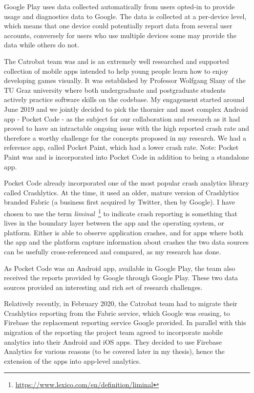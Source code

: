 Google Play uses data collected automatically from users opted-in to provide usage and diagnostics data to Google. The data is collected at a per-device level, which means that one device could potentially report data from several user accounts, conversely for users who use multiple devices some may provide the data while others do not.

The Catrobat team was and is an extremely well researched and supported collection of mobile apps intended to help young people learn how to enjoy developing games visually. It was established by Professor Wolfgang Slany of the TU Graz university where both undergraduate and postgraduate students actively practice software skills on the codebase. My engagement started around June 2019 and we jointly decided to pick the thornier and most complex Android app - Pocket Code - as the subject for our collaboration and research as it had proved to have an intractable ongoing issue with the high reported crash rate and therefore a worthy challenge for the concepts proposed in my research. We had a reference app, called Pocket Paint, which had a lower crash rate. Note: Pocket Paint was and is incorporated into Pocket Code in addition to being a standalone app.

Pocket Code already incorporated one of the most popular crash analytics library called Crashlytics. At the time, it used an older, mature version of Crashlytics branded Fabric (a business first acquired by Twitter, then by Google). I have chosen to use the term \emph{liminal}~\footnote{\url{https://www.lexico.com/en/definition/liminal}} to indicate crash reporting is something that lives in the boundary layer between the app and the operating system, or platform. Either is able to observe application crashes, and for apps where both the app and the platform capture information about crashes the two data sources can be usefully cross-referenced and compared, as my research has done.

As Pocket Code was an Android app, available in Google Play, the team also received the reports provided by Google through Google Play. These two data sources provided an interesting and rich set of research challenges. 

Relatively recently, in February 2020, the Catrobat team had to migrate their Crashlytics reporting from the Fabric service, which Google was ceasing, to Firebase the replacement reporting service Google provided. In parallel with this migration of the reporting the project team agreed to incorporate mobile analytics into their Android and iOS apps. They decided to use Firebase Analytics for various reasons (to be covered later in my thesis), hence the extension of the apps into app-level analytics.

